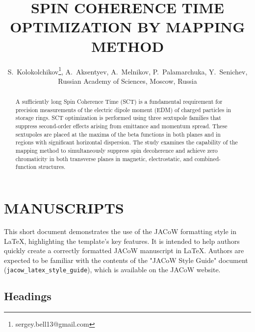 \documentclass[%
               ]{jacow}
\begin{document}
\title{SPIN COHERENCE TIME OPTIMIZATION BY MAPPING METHOD}

\author{S.~Kolokolchikov\thanks{sergey.bell13@gmail.com}, A.~Aksentyev, A.~Melnikov, P.~Palamarchuka, Y.~Senichev, Russian Academy of Sciences, Moscow, Russia}

\maketitle


\begin{abstract}
A sufficiently long Spin Coherence Time (SCT) is a fundamental requirement for precision measurements of the electric dipole moment (EDM) of charged particles in storage rings. SCT optimization is performed using three sextupole families that suppress second-order effects arising from emittance and momentum spread. These sextupoles are placed at the maxima of the beta functions in both planes and in regions with significant horizontal dispersion. The study examines the capability of the mapping method to simultaneously suppress spin decoherence and achieve zero chromaticity in both transverse planes in magnetic, electrostatic, and combined-function structures.
\end{abstract}

\section{MANUSCRIPTS}

This short document demonstrates the use of the JACoW formatting style in \LaTeX, highlighting the template's key features. It is intended to help authors quickly create a correctly formatted JACoW manuscript in \LaTeX. Authors are expected to be familiar with the contents of the "JACoW Style Guide" document (\verb|jacow_latex_style_guide|), which is available on the JACoW website.

\subsection{Headings}
\end{document}
